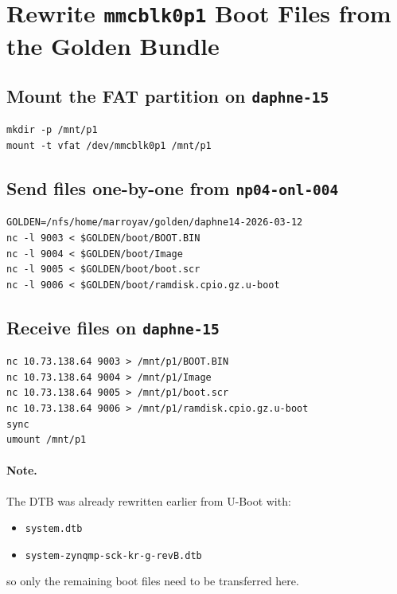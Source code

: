 \documentclass[a4paper,11pt]{article}
\begin{document}
\clearpage
\section{Rewrite \texttt{mmcblk0p1} Boot Files from the Golden Bundle}

\subsection*{Mount the FAT partition on \texttt{daphne-15}}
\begin{listing}[H]
\begin{verbatim}
mkdir -p /mnt/p1
mount -t vfat /dev/mmcblk0p1 /mnt/p1
\end{verbatim}
\caption{Mount eMMC boot partition}
\end{listing}

\subsection*{Send files one-by-one from \texttt{np04-onl-004}}
\begin{listing}[H]
\begin{verbatim}
GOLDEN=/nfs/home/marroyav/golden/daphne14-2026-03-12
nc -l 9003 < $GOLDEN/boot/BOOT.BIN
nc -l 9004 < $GOLDEN/boot/Image
nc -l 9005 < $GOLDEN/boot/boot.scr
nc -l 9006 < $GOLDEN/boot/ramdisk.cpio.gz.u-boot
\end{verbatim}
\caption{Serve the golden boot files}
\end{listing}

\subsection*{Receive files on \texttt{daphne-15}}
\begin{listing}[H]
\begin{verbatim}
nc 10.73.138.64 9003 > /mnt/p1/BOOT.BIN
nc 10.73.138.64 9004 > /mnt/p1/Image
nc 10.73.138.64 9005 > /mnt/p1/boot.scr
nc 10.73.138.64 9006 > /mnt/p1/ramdisk.cpio.gz.u-boot
sync
umount /mnt/p1
\end{verbatim}
\caption{Update the eMMC boot partition}
\end{listing}

\paragraph{Note.}
The DTB was already rewritten earlier from U-Boot with:
\begin{itemize}
  \item \texttt{system.dtb}
  \item \texttt{system-zynqmp-sck-kr-g-revB.dtb}
\end{itemize}
so only the remaining boot files need to be transferred here.
\end{document}
